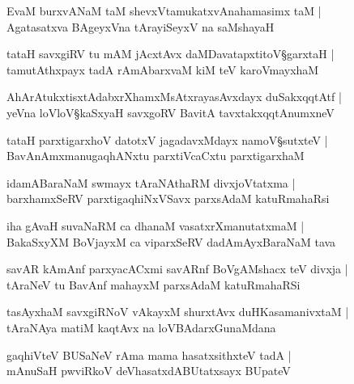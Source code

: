 \begin{shloka}
EvaM burxvANaM taM shevxVtamukatxvAnahamasimx taM |\\
Agatasatxva BAgeyxVna tArayiSeyxV na saMshayaH 
\end{shloka}

\begin{shloka}
tataH savxgiRV tu mAM jAcxtAvx daMDavatapxtitoV\S garxtaH |\\
tamutAthxpayx tadA rAmAbarxvaM kiM teV karoVmayxhaM 
\end{shloka}

\begin{shloka}
AhArAtukxtisxtAdabxrXhamxMsAtxrayasAvxdayx duSakxqqtAtf |\\
yeVna loVloV\S kaSxyaH savxgoRV BavitA tavxtakxqqtAnumxneV 
\end{shloka}

\begin{shloka}
tataH parxtigarxhoV datotxV jagadavxMdayx namoV\S sutxteV |\\
BavAnAmxmanugaqhANxtu parxtiVcaCxtu parxtigarxhaM 
\end{shloka}

\begin{shloka}
idamABaraNaM swmayx tAraNAthaRM divxjoVtatxma |\\
barxhamxSeRV parxtigaqhiNxVSavx parxsAdaM katuRmahaRsi
\end{shloka}

\begin{shloka}
iha gAvaH suvaNaRM ca dhanaM vasatxrXmanutatxmaM |\\
BakaSxyXM BoVjayxM ca viparxSeRV dadAmAyxBaraNaM tava
\end{shloka}

\begin{shloka}
savAR\R {} kAmAnf parxyacACxmi savARnf BoVgAMshacx teV divxja |\\
tAraNeV tu BavAnf mahayxM parxsAdaM katuRmahaRSi 
\end{shloka}

\begin{shloka}
tasAyxhaM savxgiRNoV vAkayxM shurxtAvx duHKasamanivxtaM |\\
tAraNAya matiM kaqtAvx na loVBAdarxGunaMdana 
\end{shloka}

\begin{shloka}
gaqhiVteV BUSaNeV rAma mama hasatxsithxteV tadA |\\
mAnuSaH pwviRkoV deVhasatxdABUtatxsayx BUpateV 
\end{shloka}

